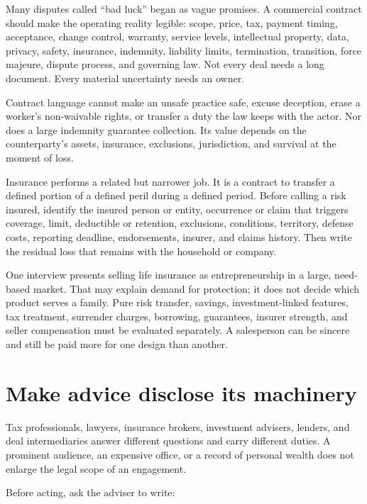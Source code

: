 Many disputes called “bad luck” began as vague promises. A commercial contract
should make the operating reality legible: scope, price, tax, payment timing,
acceptance, change control, warranty, service levels, intellectual property,
data, privacy, safety, insurance, indemnity, liability limits, termination,
transition, force majeure, dispute process, and governing law. Not every deal
needs a long document. Every material uncertainty needs an owner.

Contract language cannot make an unsafe practice safe, excuse deception,
erase a worker's non-waivable rights, or transfer a duty the law keeps with the
actor. Nor does a large indemnity guarantee collection. Its value depends on
the counterparty's assets, insurance, exclusions, jurisdiction, and survival at
the moment of loss.

Insurance performs a related but narrower job. It is a contract to transfer a
defined portion of a defined peril during a defined period. Before calling a
risk insured, identify the insured person or entity, occurrence or claim that
triggers coverage, limit, deductible or retention, exclusions, conditions,
territory, defense costs, reporting deadline, endorsements, insurer, and
claims history. Then write the residual loss that remains with the household
or company.

One interview presents selling life insurance as entrepreneurship in a large,
need-based market. That may explain demand for protection; it does not decide
which product serves a family. Pure risk transfer, savings, investment-linked
features, tax treatment, surrender charges, borrowing, guarantees, insurer
strength, and seller compensation must be evaluated separately. A salesperson
can be sincere and still be paid more for one design than another.

\section{Make advice disclose its machinery}

Tax professionals, lawyers, insurance brokers, investment advisers, lenders,
and deal intermediaries answer different questions and carry different duties.
A prominent audience, an expensive office, or a record of personal wealth
does not enlarge the legal scope of an engagement.

Before acting, ask the adviser to write:

